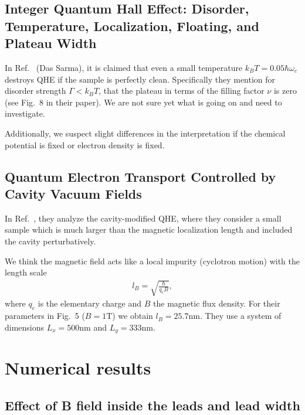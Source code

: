 \documentclass[
	secnumarabic, %
	nobibnotes, %
	aps, %
	prb, %
	floatfix, %
]{revtex4-2}
\begin{document}
\subsection{Integer Quantum Hall Effect: Disorder, Temperature, Localization, Floating, and Plateau Width}

In Ref.~\cite{yi-thomasIntegerQuantumHall2025} (Das Sarma),
	it is claimed that even a small temperature $k_B T = 0.05 \hbar \omega_c$ destroys QHE if the sample is perfectly clean.
Specifically they mention for disorder strength $\Gamma < k_B T$, that the plateau in terms of the filling factor $\nu$ is zero (see Fig.~8 in their paper).
We are not sure yet what is going on and need to investigate.

Additionally, we suspect slight differences in the interpretation if the chemical potential is fixed or electron density is fixed.

\subsection{Quantum Electron Transport Controlled by Cavity Vacuum Fields}

In Ref.~\cite{arwasQuantumElectronTransport2023},
	they analyze the cavity-modified QHE, where they consider a small sample which is much larger than the magnetic localization length and included the cavity perturbatively.

We think the magnetic field acts like a local impurity (cyclotron motion) with the length scale
\begin{align}
	l_B = \sqrt{\frac{\hbar}{q_e B}},
\end{align}
where $q_e$ is the elementary charge and $B$ the magnetic flux density. For their parameters in Fig.~5 ($B = 1 \mathrm{T}$) we obtain $l_B = 25.7 \mathrm{nm}$.
They use a system of dimensions $L_x = 500 \mathrm{nm}$ and $L_y = 333 \mathrm{nm}$.



\section{Numerical results}

\subsection{Effect of B field inside the leads and lead width}
\end{document}
